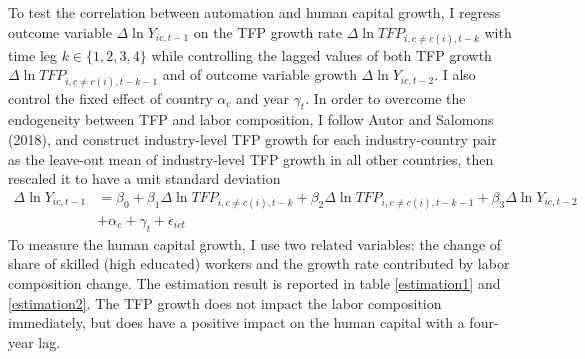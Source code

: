\documentclass[12pt]{article}
\begin{document}
To test the correlation between automation and human capital growth, I regress outcome variable $\Delta \ln Y_{i c, t-1}$ on the TFP growth rate $\Delta \ln TFP_{i, c \neq c(i), t-k}$ with time leg $k \in \{1,2,3,4\}$ while controlling the lagged values of both TFP growth $\Delta \ln TFP_{i, c \neq c(i), t-k-1}$ and of outcome variable growth $\Delta \ln Y_{ic, t-2}$. I also control the fixed effect of country $\alpha_{c}$ and year $\gamma_{t}$. In order to overcome the endogeneity between TFP and labor composition, I follow Autor and Salomons (2018)\cite{AutorSalomons2018}, and construct industry-level TFP growth for each industry-country pair as the leave-out mean of industry-level TFP growth in all other countries, then rescaled it to have a unit standard deviation
 \begin{align*}
 \Delta \ln Y_{i c, t-1} &=\beta_{0}+\beta_{1} \Delta \ln TFP_{i, c \neq c(i), t-k} +\beta_{2} \Delta \ln TFP_{i, c \neq c(i), t-k-1}+\beta_{3} \Delta \ln Y_{i c, t-2}\\
 &+\alpha_{c}+\gamma_{t}+\epsilon_{ict}
\end{align*}
To measure the human capital growth, I use two related variables: the change of share of skilled (high educated) workers and the growth rate contributed by labor composition change. The estimation result is reported in table \ref{estimation1} and \ref{estimation2}. The TFP growth does not impact the labor composition immediately, but does have a positive impact on the human capital with a four-year lag. 
\end{document}
